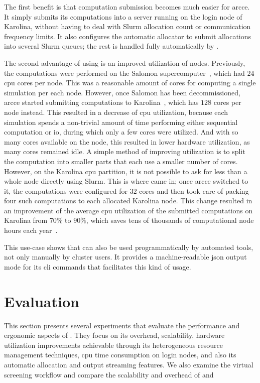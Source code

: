 The first benefit is that computation submission becomes much easier for \gls{arcce}.
It simply submits its computations into a \hyperqueue{} server running on the login node
of Karolina, without having to deal with Slurm allocation count or communication frequency limits.
It also configures the automatic allocator to submit allocations into several Slurm queues; the
rest is handled fully automatically by \hyperqueue{}.

The second advantage of using \hyperqueue{} is an improved utilization of nodes.
Previously, the computations were performed on the Salomon supercomputer~\cite{salomon},
which had $24$ \gls{cpu} cores per node. This was a reasonable
amount of cores for computing a single simulation per each node. However, once Salomon has been
decommissioned, \gls{arcce} started submitting computations to
Karolina~\cite{karolina}, which has $128$ cores per node instead. This
resulted in a decrease of \gls{cpu} utilization, because each simulation spends a
non-trivial amount of time performing either sequential computation or \gls{io},
during which only a few cores were utilized. And with so many cores available on the node, this
resulted in lower hardware utilization, as many cores remained idle. A simple method of improving
utilization is to split the computation into smaller parts that each use a smaller number of cores.
However, on the Karolina \gls{cpu} partition, it is not possible to ask for less than
a whole node directly using Slurm. This is where \hyperqueue{} came in; once
\gls{arcce} switched to it, the computations were configured for $32$
cores and \hyperqueue{} then took care of packing four such computations to each
allocated Karolina node. This change resulted in an improvement of the average
\gls{cpu} utilization of the submitted computations on Karolina from
$70\%$ to $90\%$, which saves tens of thousands of computational
node hours each year~\cite{cern-hq}.

This use-case shows that \hyperqueue{} can also be used programmatically by automated
tools, not only manually by cluster users. It provides a machine-readable \gls{json}
output mode for its \gls{cli} commands that facilitates this kind of usage.

\section{Evaluation}
\label{hq:evaluation}
This section presents several experiments that evaluate the performance and ergonomic aspects of
\hyperqueue{}. They focus on its overhead, scalability, hardware utilization improvements
achievable through its heterogeneous resource management techniques, \gls{cpu} time consumption on login nodes,
and also its automatic allocation and output streaming features. We also examine the \hyperqueue{}
virtual screening workflow and compare the scalability and overhead of \hyperqueue{} and \dask{}

